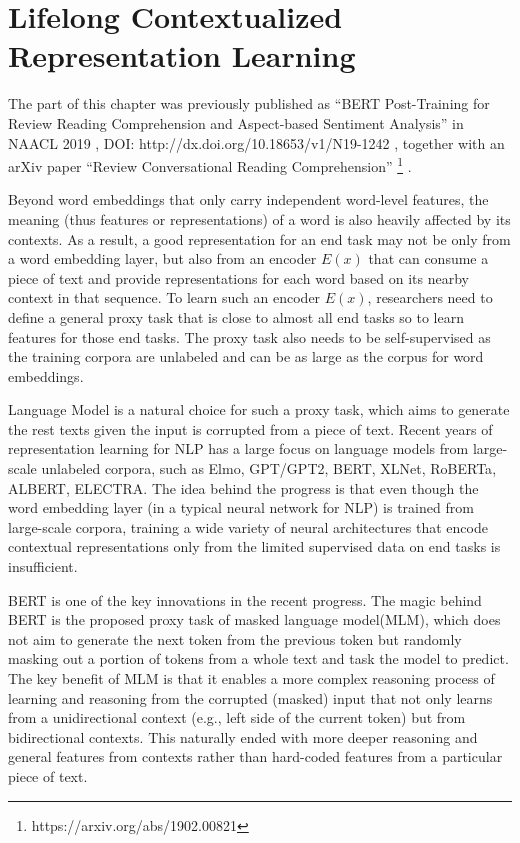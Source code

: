 \chapter{Lifelong Contextualized Representation Learning}
\label{chap4:context}

The part of this chapter was previously published as ``BERT Post-Training for Review Reading Comprehension and Aspect-based Sentiment Analysis'' in NAACL 2019 \cite{xu2019bert}, DOI: http://dx.doi.org/10.18653/v1/N19-1242 %
, together with an arXiv paper ``Review Conversational Reading Comprehension'' \footnote{https://arxiv.org/abs/1902.00821} \cite{xu2019review}.

Beyond word embeddings that only carry independent word-level features, the meaning (thus features or representations) of a word is also heavily affected by its contexts.
As a result, a good representation for an end task may not be only from a word embedding layer, but also from an encoder $E(x)$ that can consume a piece of text and provide representations for each word based on its nearby context in that sequence.
To learn such an encoder $E(x)$, researchers need to define a general proxy task that is close to almost all end tasks so to learn features for those end tasks.
The proxy task also needs to be self-supervised as the training corpora are unlabeled and can be as large as the corpus for word embeddings.

Language Model is a natural choice for such a proxy task, which aims to generate the rest texts given the input is corrupted from a piece of text.
Recent years of representation learning for NLP has a large focus on language models from large-scale unlabeled corpora, such as Elmo\cite{peters2018deep}, GPT/GPT2\cite{radford2018improving,radford2019language}, BERT\cite{devlin2018bert}, XLNet\cite{yang2019xlnet}, RoBERTa\cite{liu2019roberta}, ALBERT\cite{lan2019albert}, ELECTRA\cite{clark2019electra}.
The idea behind the progress is that even though the word embedding \cite{mikolov2013distributed,pennington2014glove} layer (in a typical neural network for NLP) is trained from large-scale corpora, training a wide variety of neural architectures that encode contextual representations only from the limited supervised data on end tasks is insufficient.

BERT\cite{devlin2018bert} is one of the key innovations in the recent progress.
The magic behind BERT is the proposed proxy task of masked language model(MLM), which does not aim to generate the next token from the previous token but randomly masking out a portion of tokens from a whole text and task the model to predict.
The key benefit of MLM is that it enables a more complex reasoning process of learning and reasoning from the corrupted (masked) input that not only learns from a unidirectional context (e.g., left side of the current token) but from bidirectional contexts.
This naturally ended with more deeper reasoning and general features from contexts rather than hard-coded features from a particular piece of text.


